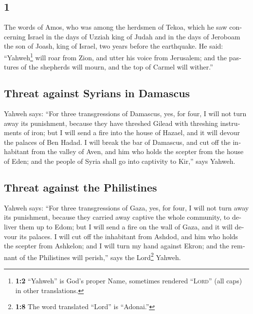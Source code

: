 \begin{paracol}{2}
\begin{otherlanguage}{english}
\hypertarget{section-1}{%
\section{1}\label{section-1}}

 The words of Amos, who was among the herdsmen of Tekoa,
which he saw concerning Israel in the days of Uzziah king of Judah and
in the days of Jeroboam the son of Joash, king of Israel, two years
before the earthquake.  He said: ``Yahweh\footnote{\textbf{1:2}
  ``Yahweh'' is God's proper Name, sometimes rendered ``\textsc{Lord}''
  (all caps) in other translations.} will roar from Zion, and utter his
voice from Jerusalem; and the pastures of the shepherds will mourn, and
the top of Carmel will wither.''

\hypertarget{threat-against-syrians-in-damascus}{%
\subsection{Threat against Syrians in
Damascus}\label{threat-against-syrians-in-damascus}}

 Yahweh says: ``For three transgressions of Damascus, yes,
for four, I will not turn away its punishment, because they have
threshed Gilead with threshing instruments of iron;  but I
will send a fire into the house of Hazael, and it will devour the
palaces of Ben Hadad.  I will break the bar of Damascus,
and cut off the inhabitant from the valley of Aven, and him who holds
the scepter from the house of Eden; and the people of Syria shall go
into captivity to Kir,'' says Yahweh.

\hypertarget{threat-against-the-philistines}{%
\subsection{Threat against the
Philistines}\label{threat-against-the-philistines}}

 Yahweh says: ``For three transgressions of Gaza, yes, for
four, I will not turn away its punishment, because they carried away
captive the whole community, to deliver them up to Edom; 
but I will send a fire on the wall of Gaza, and it will devour its
palaces.  I will cut off the inhabitant from Ashdod, and
him who holds the scepter from Ashkelon; and I will turn my hand against
Ekron; and the remnant of the Philistines will perish,'' says the
Lord\footnote{\textbf{1:8} The word translated ``Lord'' is ``Adonai.''}
Yahweh.


\end{otherlanguage}
\end{paracol}

